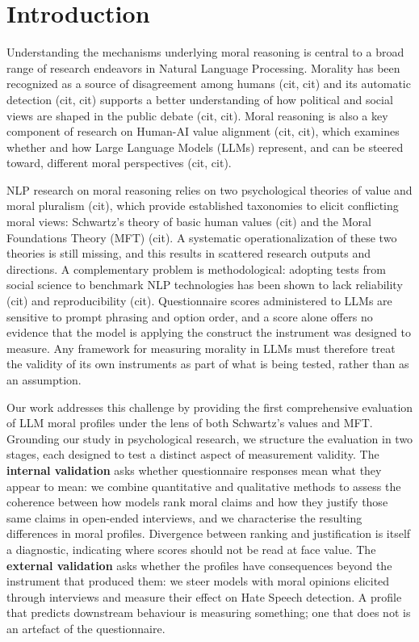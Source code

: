 \section{Introduction} \label{sec:intro}
Understanding the mechanisms underlying moral reasoning is central to a broad range of
research endeavors in Natural Language Processing. Morality has been recognized as a
source of disagreement among humans (cit, cit) and its automatic detection (cit, cit)
supports a better understanding of how political and social views are shaped in the
public debate (cit, cit). Moral reasoning is also a key component of research on
Human-AI value alignment (cit, cit), which examines whether and how Large Language
Models (LLMs) represent, and can be steered toward, different moral perspectives
(cit, cit).

NLP research on moral reasoning relies on two psychological theories of value and
moral pluralism (cit), which provide established taxonomies to elicit conflicting
moral views: Schwartz's theory of basic human values (cit) and the Moral Foundations
Theory (MFT) (cit). A systematic operationalization of these two theories is still
missing, and this results in scattered research outputs and directions. A
complementary problem is methodological: adopting tests from social science to
benchmark NLP technologies has been shown to lack reliability (cit) and
reproducibility (cit). Questionnaire scores administered to LLMs are sensitive to
prompt phrasing and option order, and a score alone offers no evidence that the model
is applying the construct the instrument was designed to measure. Any framework for
measuring morality in LLMs must therefore treat the validity of its own instruments as
part of what is being tested, rather than as an assumption.

Our work addresses this challenge by providing the first comprehensive evaluation of
LLM moral profiles under the lens of both Schwartz's values and MFT. Grounding our
study in psychological research, we structure the evaluation in two stages, each
designed to test a distinct aspect of measurement validity. The \textbf{internal
validation} asks whether questionnaire responses mean what they appear to mean: we
combine quantitative and qualitative methods to assess the coherence between how
models rank moral claims and how they justify those same claims in open-ended
interviews, and we characterise the resulting differences in moral profiles.
Divergence between ranking and justification is itself a diagnostic, indicating where
scores should not be read at face value. The \textbf{external validation} asks whether
the profiles have consequences beyond the instrument that produced them: we steer
models with moral opinions elicited through interviews and measure their effect on
Hate Speech detection. A profile that predicts downstream behaviour is measuring
something; one that does not is an artefact of the questionnaire.

